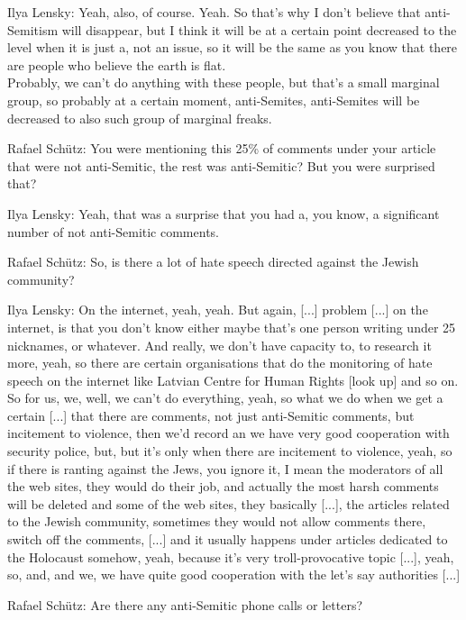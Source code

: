 Ilya Lensky: Yeah, also, of course. Yeah. So that’s why I don’t believe that anti-Semitism will disappear, but I think it will be at a certain point decreased to the level when it is just a, not an issue, so it will be the same as you know that there are people who believe the earth is flat.\\
Probably, we can’t do anything with these people, but that’s a small marginal group, so probably at a certain moment, anti-Semites, anti-Semites will be decreased to also such group of marginal freaks. 

Rafael Schütz: You were mentioning this 25\% of comments under your article that were not anti-Semitic, the rest was anti-Semitic? But you were surprised that? 

Ilya Lensky: Yeah, that was a surprise that you had a, you know, a significant number of not anti-Semitic comments. 

Rafael Schütz: So, is there a lot of hate speech directed against the Jewish community? 

Ilya Lensky: On the internet, yeah, yeah. But again, [...] problem [...] on the internet, is that you don’t know either maybe that’s one person writing under 25 nicknames, or whatever. And really, we don’t have capacity to, to research it more, yeah, so there are certain organisations that do the monitoring of hate speech on the internet like Latvian Centre for Human Rights [look up] and so on. So for us, we, well, we can’t do everything, yeah, so what we do when we get a certain [...] that there are comments, not just anti-Semitic comments, but incitement to violence, then we’d record an we have very good cooperation with security police, but, but it’s only when there are incitement to violence, yeah, so if there is ranting against the Jews, you ignore it, I mean the moderators of all the web sites, they would do their job, and actually the most harsh comments will be deleted and some of the web sites, they basically [...], the articles related to the Jewish community, sometimes they would not allow comments there, switch off the comments, [...] and it usually happens under articles dedicated to the Holocaust somehow, yeah, because it's very troll-provocative topic [...], yeah, so, and, and we, we have quite good cooperation with the let’s say authorities [...] 

Rafael Schütz: Are there any anti-Semitic phone calls or letters? 

